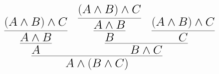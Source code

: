 \documentclass[14pt,border=2pt]{standalone}
\begin{document}
        $$
        \LARGE 

\begin{prooftree}
\hypo{ (A \land B) \land C } \infer1{ A \land B } \infer1{A}
\hypo{ (A \land B) \land C } \infer1{ A \land B } \infer1{B}
\hypo{ (A \land B) \land C } \infer1{ C }
\infer2{ B \land C}
\infer2{ A \land (B \land C) }
\end{prooftree}
        $$
        
\end{document}
